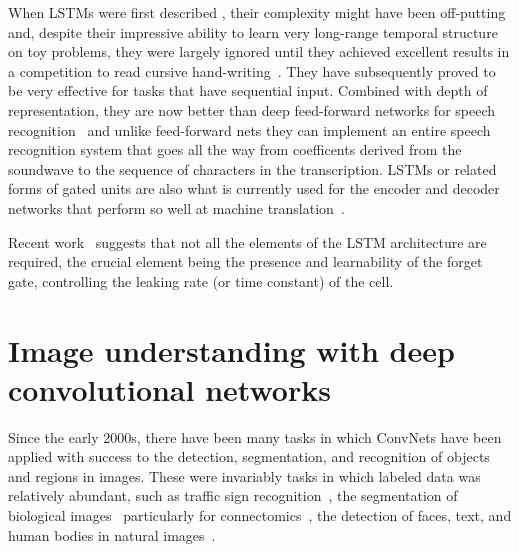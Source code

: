 \documentclass[10pts]{article}
\begin{document}
When LSTMs were first described %
\citep{Hochreiter+Schmidhuber-1997},
their complexity might have been off-putting
and, despite their impressive ability to learn very long-range temporal
structure on toy problems, they were largely ignored until they achieved
excellent results in a competition to read cursive
hand-writing~\citep{Graves-et-al-2009}. They have subsequently proved to be very
effective for tasks that have sequential input.  Combined with depth of
representation, they are now better than
deep feed-forward networks for speech recognition~\citep{Graves-et-al-ICASSP2013} and
unlike feed-forward nets they can implement an entire speech recognition
system that goes all the way from coefficents derived from the soundwave to
the sequence of characters in the transcription.  LSTMs or related forms of gated
units are also what is currently used for the encoder and decoder networks that
perform so well at machine
translation~\citep{Bahdanau-et-al-arxiv2014,Sutskever-et-al-NIPS2014}.

Recent work~\citep{Chung-et-al-NIPSDL2014-small,Yao-et-al-SLU-workshop2014} 
suggests that not all the elements of the LSTM
architecture are required, the crucial element being the presence and learnability 
of the forget gate, controlling the leaking rate (or time constant) of the cell.


\section{Image understanding with deep convolutional networks}

Since the early 2000s, there have been many tasks in which ConvNets
have been applied with success to the detection, segmentation, and
recognition of objects and regions in images. These were invariably
tasks in which labeled data was relatively abundant, such as traffic
sign recognition~\cite{sermanet-ijcnn-11,Ciresan-et-al-2012}, the
segmentation of biological images~\cite{ning-05} particularly for
connectomics~\cite{Turaga2010}, the detection of faces, text, and human bodies in natural
images~\cite{vaillant-monrocq-lecun-94,nowlan-platt-95,garcia-delakis-04,osadchy-07,nasse-09,taylor-xx,sermanet-cvpr-13,Tompson-et-al-arxiv2014}.
\end{document}
